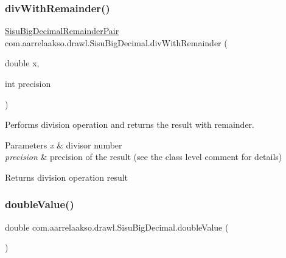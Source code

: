 \subsubsection{\texorpdfstring{div\+With\+Remainder()}{divWithRemainder()}\hspace{0.1cm}{\footnotesize\ttfamily [2/2]}}
{\footnotesize\ttfamily \hyperlink{classcom_1_1aarrelaakso_1_1drawl_1_1_sisu_big_decimal_remainder_pair}{Sisu\+Big\+Decimal\+Remainder\+Pair} com.\+aarrelaakso.\+drawl.\+Sisu\+Big\+Decimal.\+div\+With\+Remainder (\begin{DoxyParamCaption}\item[{double}]{x,  }\item[{int}]{precision }\end{DoxyParamCaption})\hspace{0.3cm}{\ttfamily [protected]}}



Performs division operation and returns the result with remainder. 


\begin{DoxyParams}{Parameters}
{\em x} & divisor number \\
\hline
{\em precision} & precision of the result (see the class level comment for details) \\
\hline
\end{DoxyParams}
\begin{DoxyReturn}{Returns}
division operation result 
\end{DoxyReturn}
\mbox{\label{classcom_1_1aarrelaakso_1_1drawl_1_1_sisu_big_decimal_a4b69c8b90193583069b152ffa4fec2a6}} 
\subsubsection{\texorpdfstring{double\+Value()}{doubleValue()}}
{\footnotesize\ttfamily double com.\+aarrelaakso.\+drawl.\+Sisu\+Big\+Decimal.\+double\+Value (\begin{DoxyParamCaption}{ }\end{DoxyParamCaption})\hspace{0.3cm}{\ttfamily [protected]}}



